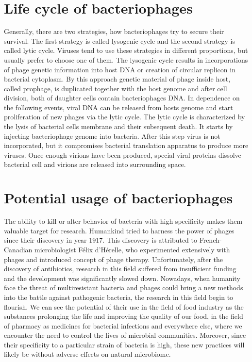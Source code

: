 \section{Life cycle of bacteriophages}
Generally, there are two strategies, how bacteriophages try to secure their survival.
The first strategy is called lysogenic cycle and the second strategy is called lytic cycle.
Viruses tend to use these strategies in different proportions, but usually prefer to choose one of them.
The lysogenic cycle results in incorporations of phage genetic information into host DNA or creation of circular replicon in bacterial cytoplasm.
By this approach genetic material of phage inside host, called prophage, is duplicated together with the host genome and after cell division, both of daughter cells contain bacteriophages DNA.
In dependence on the following events, viral DNA can be released from hosts genome and start proliferation of new phages via the lytic cycle.
The lytic cycle is characterized by the lysis of bacterial cells membrane and their subsequent death.
It starts by injecting bacteriophage genome into bacteria.
After this step virus is not incorporated, but it compromises bacterial translation apparatus to produce more viruses.
Once enough virions have been produced, special viral proteins dissolve bacterial cell and virions are released into surrounding space.

\section{Potential usage of bacteriophages}
The ability to kill or alter behavior of bacteria with high specificity makes them valuable target for research.
Humankind tried to harness the power of phages since their discovery in year 1917.
This discovery is attributed to French-Canadian microbiologist Félix d'Hérelle, who experimented extensively with phages and introduced concept of phage therapy\cite{phages_in_nature}.
Unfortunately, after the discovery of antibiotics, research in this field suffered from insufficient funding and the development was significantly slowed down.
Nowadays, when humanity face the threat of multiresistant bacteria and phages could bring a new methods into the battle against pathogenic bacteria, the research in this field begin to flourish.
We can see the potential of their use in the field of food industry as the substances prolonging the life and improving the quality of our food, in the field of pharmacy as medicines for bacterial infections and everywhere else, where we encounter the need to control the lives of microbial communities.
Moreover, since their specificity to a particular strain of bacteria is high, these new practices will likely be without adverse effects on natural microbiome.

